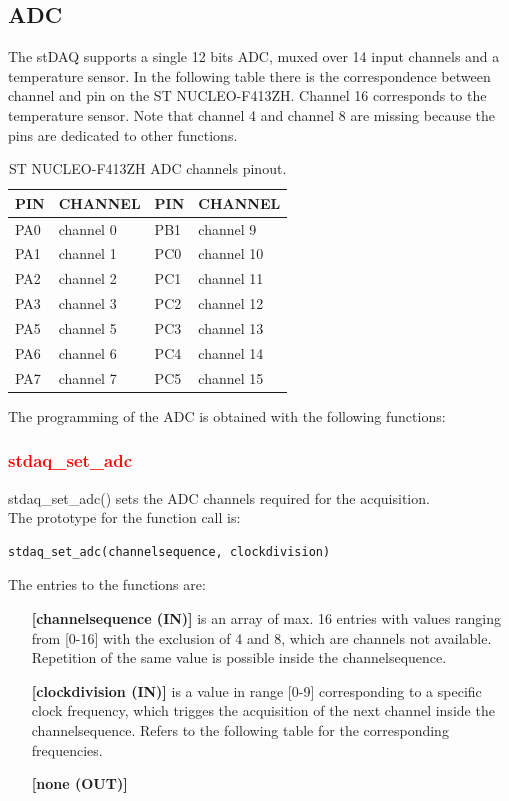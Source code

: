 \documentclass[letterpaper,10pt,english]{hitec}
\begin{document}
\newpage

\subsection{ADC}

The stDAQ supports a single 12 bits ADC, muxed over 14 input channels and a temperature sensor.
In the following table there is the correspondence between channel and pin on the ST NUCLEO-F413ZH.
Channel 16 corresponds to the temperature sensor. Note that channel 4 and channel 8 are missing because the pins are dedicated to other functions.

\begin{table}[h]
\caption{ST NUCLEO-F413ZH ADC channels pinout.}
\centering
\begin{tabular}{|ll|ll|}
 \textbf{PIN} & \textbf{CHANNEL} & \textbf{PIN} & \textbf{CHANNEL} \\ \hline
 PA0 & channel 0 & PB1 & channel 9 \\
 PA1 & channel 1 & PC0 & channel 10 \\
 PA2 & channel 2 & PC1 & channel 11 \\
 PA3 & channel 3 & PC2 & channel 12 \\
 PA5 & channel 5 & PC3 & channel 13 \\
 PA6 & channel 6 & PC4 & channel 14 \\
 PA7 & channel 7 & PC5 & channel 15 
\end{tabular}
\end{table}
The programming of the ADC is obtained with the following functions:

\subsubsection{\textcolor{red}{stdaq\_set\_adc}}

stdaq\_set\_adc() sets the ADC channels required for the acquisition. \\
The prototype for the function call is: 
\begin{verbatim}
stdaq_set_adc(channelsequence, clockdivision)
\end{verbatim}
The entries to the functions are:
\begin{itemize}
\item [\textbf{[channelsequence (IN)]}] is an array of max. 16 entries with values ranging from [0-16] with the exclusion of 4 and 8, which are channels not available. Repetition of the same value is possible inside the channelsequence.
\item [\textbf{[clockdivision (IN)]}] is a value in range [0-9] corresponding to a specific clock frequency, which trigges the acquisition of the next channel inside the channelsequence. Refers to the following table for the corresponding frequencies.
\item [\textbf{[none (OUT)]}]
\end{itemize}
\end{document}
